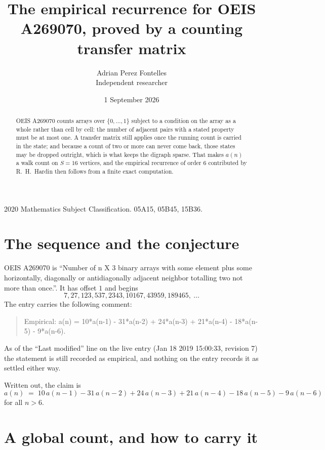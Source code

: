\documentclass[11pt,a4paper]{article}
\title{The empirical recurrence for OEIS A269070, proved by a counting transfer matrix}
\author{Adrian Perez Fontelles\\ \small Independent researcher}
\date{1 September 2026}
\theoremstyle{plain}
\theoremstyle{definition}
\begin{document}
\maketitle

\begin{abstract}
OEIS A269070 counts arrays over $\{0,\dots,1\}$ subject to a condition on the array as a
whole rather than cell by cell: the number of adjacent pairs with a stated property must be
at most one. A transfer matrix still applies once the running count is carried in the state; and
because a count of two or more can never come back, those states may be dropped outright,
which is what keeps the digraph sparse. That makes $a(n)$ a walk count on $S=16$ vertices,
and the empirical recurrence of order $6$ contributed by R.~H.~Hardin then follows from
a finite exact computation.
\end{abstract}

\noindent\small 2020 Mathematics Subject Classification. 05A15, 05B45, 15B36.\normalsize

\section{The sequence and the conjecture}

OEIS A269070 is ``Number of n X 3 binary arrays with some element plus some horizontally, diagonally or antidiagonally adjacent neighbor totalling two not more than once.''. It has offset $1$ and begins
\[
7, 27, 123, 537, 2343, 10167, 43959, 189465,\ \dots
\]
The entry carries the following comment:
\begin{quote}\small
Empirical: a(n) = 10*a(n-1) - 31*a(n-2) + 24*a(n-3) + 21*a(n-4) - 18*a(n-5) - 9*a(n-6).
\end{quote}
As of the ``Last modified'' line on the live entry (Jan 18 2019 15:00:33, revision 7) the statement is
still recorded as empirical, and nothing on the entry records it as settled either way.

Written out, the claim is
\begin{equation}\label{eq:conj}
a(n)\;=\;10\,a(n-1) - 31\,a(n-2) + 24\,a(n-3) + 21\,a(n-4) - 18\,a(n-5) - 9\,a(n-6)
\end{equation}
for all $n>6$.

\section{A global count, and how to carry it}
\end{document}
